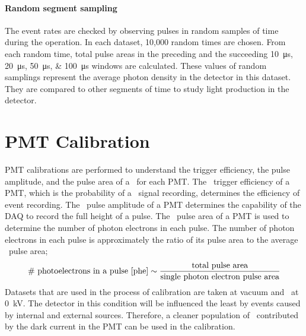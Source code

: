 \paragraph{Random segment sampling}
The event rates are checked by observing pulses in random samples of time during the operation. In each dataset, 10,000 random times are chosen. From each random time, total pulse areas in the preceding and the succeeding \SIlist{10;20;50;100}{\us} windows are calculated. These values of random samplings represent the average photon density in the detector in this dataset. They are compared to other segments of time to study light production in the detector.  

\section{PMT Calibration}
\label{sec:pmt cal} 
PMT calibrations are performed to understand the trigger efficiency, the pulse amplitude, and the pulse area of a \sphe\ for each PMT. The \sphe\ trigger efficiency of a PMT, which is the probability of a \sphe\ signal recording, determines the efficiency of event recording. The \sphe\ pulse amplitude of a PMT determines the capability of the DAQ to record the full height of a pulse. The \sphe\ pulse area of a PMT is used to determine the number of photon electrons in each pulse. The number of photon electrons in each pulse is approximately the ratio of its pulse area to the average \sphe\ pulse area; 
\begin{align}
  	\text{\#\  photoelectrons in a pulse [\si{phe}]} \sim \frac{\text{total pulse area}}{\text{single photon electron pulse area}}
\end{align}     
Datasets that are used in the process of calibration are taken at vacuum and \opvtvb\ at \SI{0}{\kV}. The detector in this condition will be influenced the least by events caused by internal and external sources. Therefore, a cleaner population of \sphe\ contributed by the dark current in the PMT can be used in the calibration. 
  
  

